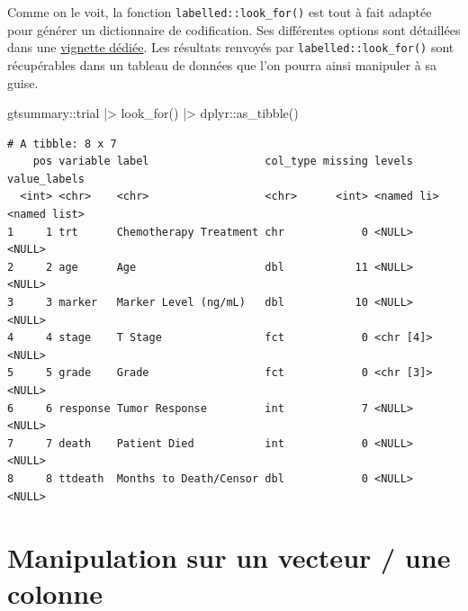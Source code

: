 \documentclass[
  letterpaper,
  DIV=11,
  numbers=noendperiod,
  oneside]{scrreprt}
\newenvironment{Shaded}{\begin{snugshade}}{\end{snugshade}}
\newcommand{\FunctionTok}[1]{\textcolor[rgb]{0.28,0.35,0.67}{#1}}
\newcommand{\NormalTok}[1]{\textcolor[rgb]{0.00,0.23,0.31}{#1}}
\newcommand{\SpecialCharTok}[1]{\textcolor[rgb]{0.37,0.37,0.37}{#1}}
\begin{document}
\begin{tcolorbox}[enhanced jigsaw, colbacktitle=quarto-callout-tip-color!10!white, opacityback=0, toprule=.15mm, colback=white, coltitle=black, bottomtitle=1mm, toptitle=1mm, titlerule=0mm, rightrule=.15mm, title=\textcolor{quarto-callout-tip-color}{\faLightbulb}\hspace{0.5em}{Astuce}, breakable, bottomrule=.15mm, opacitybacktitle=0.6, arc=.35mm, left=2mm, leftrule=.75mm, colframe=quarto-callout-tip-color-frame]

Comme on le voit, la fonction \texttt{labelled::look\_for()} est tout à
fait adaptée pour générer un dictionnaire de codification. Ses
différentes options sont détaillées dans une
\href{https://larmarange.github.io/labelled/articles/look_for.html}{vignette
dédiée}. Les résultats renvoyés par \texttt{labelled::look\_for()} sont
récupérables dans un tableau de données que l'on pourra ainsi manipuler
à sa guise.

\begin{Shaded}
\begin{Highlighting}[]
\NormalTok{gtsummary}\SpecialCharTok{::}\NormalTok{trial }\SpecialCharTok{|\textgreater{}} 
  \FunctionTok{look\_for}\NormalTok{() }\SpecialCharTok{|\textgreater{}} 
\NormalTok{  dplyr}\SpecialCharTok{::}\FunctionTok{as\_tibble}\NormalTok{()}
\end{Highlighting}
\end{Shaded}

\begin{verbatim}
# A tibble: 8 x 7
    pos variable label                  col_type missing levels     value_labels
  <int> <chr>    <chr>                  <chr>      <int> <named li> <named list>
1     1 trt      Chemotherapy Treatment chr            0 <NULL>     <NULL>      
2     2 age      Age                    dbl           11 <NULL>     <NULL>      
3     3 marker   Marker Level (ng/mL)   dbl           10 <NULL>     <NULL>      
4     4 stage    T Stage                fct            0 <chr [4]>  <NULL>      
5     5 grade    Grade                  fct            0 <chr [3]>  <NULL>      
6     6 response Tumor Response         int            7 <NULL>     <NULL>      
7     7 death    Patient Died           int            0 <NULL>     <NULL>      
8     8 ttdeath  Months to Death/Censor dbl            0 <NULL>     <NULL>      
\end{verbatim}

\end{tcolorbox}

\hypertarget{manipulation-sur-un-vecteur-une-colonne}{%
\section{Manipulation sur un vecteur / une
colonne}\label{manipulation-sur-un-vecteur-une-colonne}}
\end{document}
